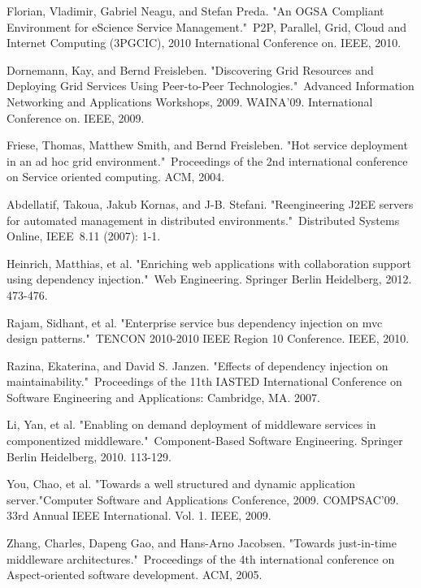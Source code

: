 \documentclass[conference]{IEEEtran}
\begin{document}
\begin{thebibliography}{9}
Florian, Vladimir, Gabriel Neagu, and Stefan Preda. "An OGSA Compliant Environment for eScience Service Management." P2P, Parallel, Grid, Cloud and Internet Computing (3PGCIC), 2010 International Conference on. IEEE, 2010.

Dornemann, Kay, and Bernd Freisleben. "Discovering Grid Resources and Deploying Grid Services Using Peer-to-Peer Technologies." Advanced Information Networking and Applications Workshops, 2009. WAINA'09. International Conference on. IEEE, 2009.

Friese, Thomas, Matthew Smith, and Bernd Freisleben. "Hot service deployment in an ad hoc grid environment." Proceedings of the 2nd international conference on Service oriented computing. ACM, 2004.

Abdellatif, Takoua, Jakub Kornas, and J-B. Stefani. "Reengineering J2EE servers for automated management in distributed environments." Distributed Systems Online, IEEE 8.11 (2007): 1-1.

Heinrich, Matthias, et al. "Enriching web applications with collaboration support using dependency injection." Web Engineering. Springer Berlin Heidelberg, 2012. 473-476.

Rajam, Sidhant, et al. "Enterprise service bus dependency injection on mvc design patterns." TENCON 2010-2010 IEEE Region 10 Conference. IEEE, 2010.

Razina, Ekaterina, and David S. Janzen. "Effects of dependency injection on maintainability." Proceedings of the 11th IASTED International Conference on Software Engineering and Applications: Cambridge, MA. 2007.

Li, Yan, et al. "Enabling on demand deployment of middleware services in componentized middleware." Component-Based Software Engineering. Springer Berlin Heidelberg, 2010. 113-129.

You, Chao, et al. "Towards a well structured and dynamic application server."Computer Software and Applications Conference, 2009. COMPSAC'09. 33rd Annual IEEE International. Vol. 1. IEEE, 2009.

Zhang, Charles, Dapeng Gao, and Hans-Arno Jacobsen. "Towards just-in-time middleware architectures." Proceedings of the 4th international conference on Aspect-oriented software development. ACM, 2005.


\end{thebibliography}
\end{document}
